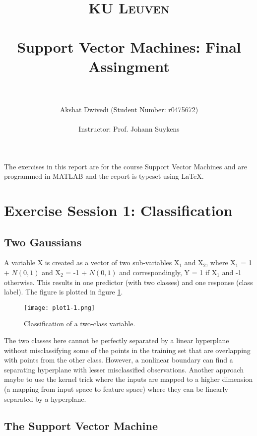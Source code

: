 \documentclass[paper=a4, fontsize=11pt]{scrartcl} %
\title{	
\normalfont \normalsize 
\textsc{\Large KU Leuven} \\ [30pt] %
\horrule{0.5pt} \\[0.4cm] %
\huge Support Vector Machines: Final Assingment \\ %
\horrule{2pt} \\[0.5cm] %
}
\author{Akshat Dwivedi (Student Number: r0475672)\\
\\
Instructor: Prof. Johann Suykens} %
\numberwithin{equation}{section} %
\begin{document}
\maketitle %

\thispagestyle{empty}
\clearpage

\tableofcontents
\thispagestyle{empty}
\clearpage
\setcounter{page}{1}



The exercises in this report are for the course Support Vector Machines and are programmed in MATLAB and the report is typeset using \LaTeX.

\section{Exercise Session 1: Classification}

\subsection{Two Gaussians}

A variable X is created as a vector of two sub-variables X$_1$ and X$_2$, where X$_1$ = 1 + $N(0,1)$ and X$_2$ = -1 + $N(0,1)$ and correspondingly, Y = 1 if X$_1$ and -1 otherwise. This results in one predictor (with two classes) and one response (class label). The figure is plotted in figure \ref{1-1}.

\begin{figure}[ht]
\centering
\texttt{[image: plot1-1.png]}
\caption{Classification of a two-class variable.}
\label{1-1}
\end{figure}

The two classes here cannot be perfectly separated by a linear hyperplane without misclassifying some of the points in the training set that are overlapping with points from the other class. However, a nonlinear boundary can find a separating hyperplane with lesser misclassified observations. Another approach maybe to use the kernel trick where the inputs are mapped to a higher dimension (a mapping from input space to feature space) where they can be linearly separated by a hyperplane.

\subsection{The Support Vector Machine}
\end{document}
